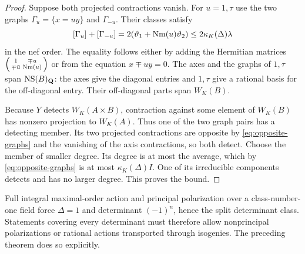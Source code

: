 \begin{proof}
Suppose both projected contractions vanish. For $u=1,\tau$ use the two graphs $\Gamma_u=\{x=u y\}$ and $\Gamma_{-u}$. Their classes satisfy
\begin{equation}\label{eq:opposite-graphs}
 [\Gamma_u]+[\Gamma_{-u}]
 =2(\vartheta_1+\operatorname{Nm}(u)\vartheta_2)
 \le2\kappa_K(\Delta)\lambda
\end{equation}
in the nef order. The equality follows either by adding the Hermitian matrices
$\left(\begin{smallmatrix}1&\mp u\\\mp\bar u&\operatorname{Nm}(u)\end{smallmatrix}\right)$ or from the equation $x\mp uy=0$. The axes and the graphs of $1,\tau$ span $\operatorname{NS}(B)_\mathbf Q$: the axes give the diagonal entries and $1,\tau$ give a rational basis for the off-diagonal entry. Their off-diagonal parts span $W_K(B)$.

Because $Y$ detects $W_K(A\times B)$, contraction against some element of $W_K(B)$ has nonzero projection to $W_K(A)$. Thus one of the two graph pairs has a detecting member. Its two projected contractions are opposite by \eqref{eq:opposite-graphs} and the vanishing of the axis contractions, so both detect. Choose the member of smaller degree. Its degree is at most the average, which by \eqref{eq:opposite-graphs} is at most $\kappa_K(\Delta)I$. One of its irreducible components detects and has no larger degree. This proves the bound.
\end{proof}

\begin{remark}
Full integral maximal-order action and principal polarization over a class-number-one field force $\Delta=1$ and determinant $(-1)^n$, hence the split determinant class. Statements covering every determinant must therefore allow nonprincipal polarizations or rational actions transported through isogenies. The preceding theorem does so explicitly.
\end{remark}
